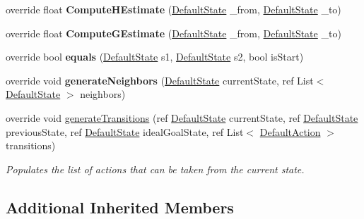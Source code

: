 \begin{DoxyCompactItemize}
\item 
\hypertarget{class_best_first_domain_a1d06e92291ef344534786f356393785d}{override float {\bfseries Compute\-H\-Estimate} (\hyperlink{class_default_state}{Default\-State} \-\_\-from, \hyperlink{class_default_state}{Default\-State} \-\_\-to)}\label{class_best_first_domain_a1d06e92291ef344534786f356393785d}

\item 
\hypertarget{class_best_first_domain_aa9143172a03294ce3ac98364281a761b}{override float {\bfseries Compute\-G\-Estimate} (\hyperlink{class_default_state}{Default\-State} \-\_\-from, \hyperlink{class_default_state}{Default\-State} \-\_\-to)}\label{class_best_first_domain_aa9143172a03294ce3ac98364281a761b}

\item 
\hypertarget{class_best_first_domain_ab7c02a966dfcd1c947e57dd96b27b86c}{override bool {\bfseries equals} (\hyperlink{class_default_state}{Default\-State} s1, \hyperlink{class_default_state}{Default\-State} s2, bool is\-Start)}\label{class_best_first_domain_ab7c02a966dfcd1c947e57dd96b27b86c}

\item 
\hypertarget{class_best_first_domain_ae63dbb2ad18a754752ddc8914a9c7f06}{override void {\bfseries generate\-Neighbors} (\hyperlink{class_default_state}{Default\-State} current\-State, ref List$<$ \hyperlink{class_default_state}{Default\-State} $>$ neighbors)}\label{class_best_first_domain_ae63dbb2ad18a754752ddc8914a9c7f06}

\item 
override void \hyperlink{class_best_first_domain_a06d5fdd90348af45d2f2de4944eacd6f}{generate\-Transitions} (ref \hyperlink{class_default_state}{Default\-State} current\-State, ref \hyperlink{class_default_state}{Default\-State} previous\-State, ref \hyperlink{class_default_state}{Default\-State} ideal\-Goal\-State, ref List$<$ \hyperlink{class_default_action}{Default\-Action} $>$ transitions)
\begin{DoxyCompactList}\small\item\em Populates the list of actions that can be taken from the current state. \end{DoxyCompactList}\end{DoxyCompactItemize}
\subsection*{Additional Inherited Members}


